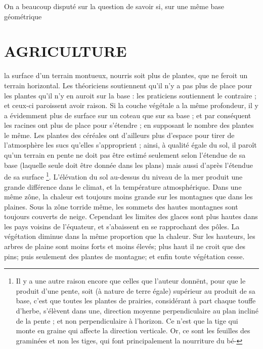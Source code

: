On a beaucoup disputé sur la question de savoir si, sur une même base géométrique\setcounter{page}{188} \section{AGRICULTURE}
la surface d'un terrain montueux, nourris soit plus de plantes, que ne feroit un terrain horizontal. Les théoriciens soutiennent qu'il n'y a pas plus de place pour les plantes qu'il n'y en auroit sur la base : les praticiens soutiennent le contraire ; et ceux-ci paroissent avoir raison. Si la couche végétale a la même profondeur, il y a évidemment plus de surface sur un coteau que sur sa base ; et par conséquent les racines ont plus de place pour s'étendre ; en supposant le nombre des plantes le même. Les plantes des céréales ont d'ailleurs plus d'espace pour tirer de l'atmosphère les sucs qu'elles s'approprient ; ainsi, à qualité égale du sol, il paroît qu'un terrain en pente ne doit pas être estimé seulement selon l'étendue de sa base (laquelle seule doit être donnée dans les plans) mais aussi d'après l'étendue de sa surface \footnote{Il y a une autre raison encore que celles que l'auteur donnënt, pour que le produit d'une pente, soit (à nature de terre égale) supérieur au produit de sa base, c'est que toutes les plantes de prairies, considérant à part chaque touffe d'herbe, s'élèvent dans une, direction moyenne perpendiculaire au plan incliné de la pente ; et non perpendiculaire à l'horizon. Ce n'est que la tige qui monte en graine qui affecte la direction verticale. Or, ce sont les feuilles des graminées et non les tiges, qui font principalement la nourriture du bé-}.\setcounter{page}{189} L'élévation du sol au-dessus du niveau de la mer produit une grande différence dans le climat, et la température atmosphérique. Dans une même zône, la chaleur est toujours moins grande sur les montagnes que dans les plaines. Sous la zône torride même, les sommets des hautes montagnes sont toujours couverts de neige. Cependant les limites des glaces sont plus hautes dans les pays voisins de l'équateur, et s'abaissent en se rapprochant des pôles. La végétation diminue dans la même proportion que la chaleur. Sur les hauteurs, les arbres de plaine sont moins forts et moins élevés; plus haut il ne croit que des pins; puis seulement des plantes de montagne; et enfin toute végétation cesse.

